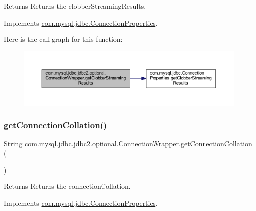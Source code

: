 \begin{DoxyReturn}{Returns}
Returns the clobber\+Streaming\+Results. 
\end{DoxyReturn}


Implements \mbox{\hyperlink{interfacecom_1_1mysql_1_1jdbc_1_1_connection_properties_a8097aba9e8a5a513b9dec2c4bfb04fd2}{com.\+mysql.\+jdbc.\+Connection\+Properties}}.

Here is the call graph for this function\+:
\nopagebreak
\begin{figure}[H]
\begin{center}
\leavevmode
\includegraphics[width=350pt]{classcom_1_1mysql_1_1jdbc_1_1jdbc2_1_1optional_1_1_connection_wrapper_a66698db6904b10d47dabdfcee7ba799e_cgraph}
\end{center}
\end{figure}
\mbox{\label{classcom_1_1mysql_1_1jdbc_1_1jdbc2_1_1optional_1_1_connection_wrapper_a84565674abf2610e671950412a2c8be7}} 
\subsubsection{\texorpdfstring{get\+Connection\+Collation()}{getConnectionCollation()}}
{\footnotesize\ttfamily String com.\+mysql.\+jdbc.\+jdbc2.\+optional.\+Connection\+Wrapper.\+get\+Connection\+Collation (\begin{DoxyParamCaption}{ }\end{DoxyParamCaption})}

\begin{DoxyReturn}{Returns}
Returns the connection\+Collation. 
\end{DoxyReturn}


Implements \mbox{\hyperlink{interfacecom_1_1mysql_1_1jdbc_1_1_connection_properties_ad1204db6592b3e0cfa702d4f6abed586}{com.\+mysql.\+jdbc.\+Connection\+Properties}}.

